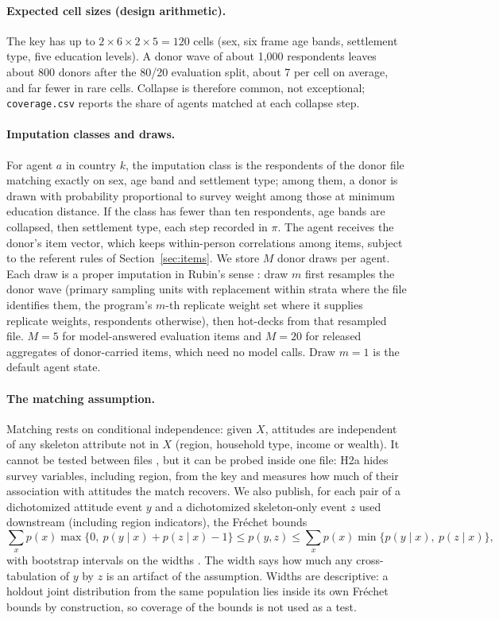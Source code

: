 \documentclass[10pt]{article}
\begin{document}
\paragraph{Expected cell sizes (design arithmetic).} The key has up to $2 \times 6 \times 2 \times 5 = 120$ cells (sex, six frame age bands, settlement type, five education levels). A donor wave of about 1,000 respondents leaves about 800 donors after the 80/20 evaluation split, about 7 per cell on average, and far fewer in rare cells. Collapse is therefore common, not exceptional; \nolinkurl{coverage.csv} reports the share of agents matched at each collapse step.

\paragraph{Imputation classes and draws.} For agent $a$ in country $k$, the imputation class is the respondents of the donor file matching exactly on sex, age band and settlement type; among them, a donor is drawn with probability proportional to survey weight among those at minimum education distance. If the class has fewer than ten respondents, age bands are collapsed, then settlement type, each step recorded in $\pi$. The agent receives the donor's item vector, which keeps within-person correlations among items, subject to the referent rules of Section~\ref{sec:items}. We store $M$ donor draws per agent. Each draw is a proper imputation in Rubin's sense \citep{rubin1987,andridge2010}: draw $m$ first resamples the donor wave (primary sampling units with replacement within strata where the file identifies them, the program's $m$-th replicate weight set where it supplies replicate weights, respondents otherwise), then hot-decks from that resampled file. $M = 5$ for model-answered evaluation items and $M = 20$ for released aggregates of donor-carried items, which need no model calls. Draw $m=1$ is the default agent state.

\paragraph{The matching assumption.} Matching rests on conditional independence: given $X$, attitudes are independent of any skeleton attribute not in $X$ (region, household type, income or wealth). It cannot be tested between files \citep{dorazio2006}, but it can be probed inside one file: H2a hides survey variables, including region, from the key and measures how much of their association with attitudes the match recovers. We also publish, for each pair of a dichotomized attitude event $y$ and a dichotomized skeleton-only event $z$ used downstream (including region indicators), the Fréchet bounds
\begin{equation}
\sum_x p(x)\max\{0,\ p(y\mid x)+p(z\mid x)-1\} \le p(y,z) \le \sum_x p(x)\min\{p(y\mid x),\ p(z\mid x)\},
\end{equation}
with bootstrap intervals on the widths \citep{dorazio2006,statmatch}. The width says how much any cross-tabulation of $y$ by $z$ is an artifact of the assumption. Widths are descriptive: a holdout joint distribution from the same population lies inside its own Fréchet bounds by construction, so coverage of the bounds is not used as a test.
\end{document}
